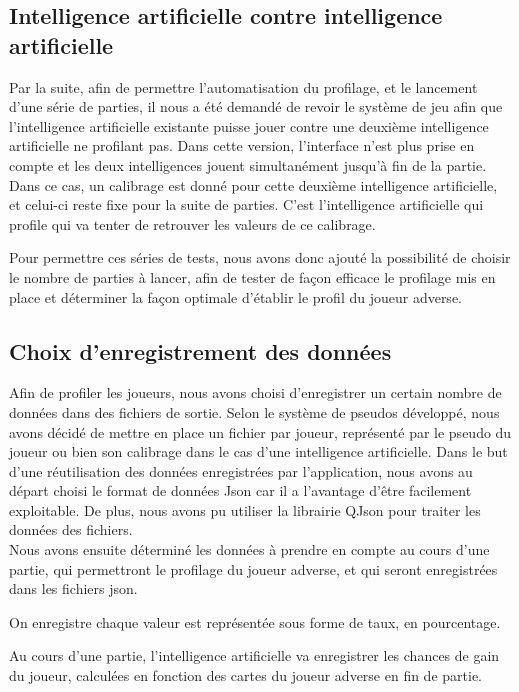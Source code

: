 \documentclass{report}
\begin{document}
\subsection{Intelligence artificielle contre intelligence artificielle}
\hspace{0.5cm}Par la suite, afin de permettre l'automatisation du profilage, et le lancement d'une série de parties, il nous a été demandé de revoir le système de jeu afin que l'intelligence artificielle existante puisse jouer contre une deuxième intelligence artificielle ne profilant pas. Dans cette version, l'interface n'est plus prise en compte et les deux intelligences jouent simultanément jusqu'à fin de la partie. Dans ce cas, un calibrage est donné pour cette deuxième intelligence artificielle, et celui-ci reste fixe pour la suite de parties. C'est l'intelligence artificielle qui profile qui va tenter de retrouver les valeurs de ce calibrage.\par
Pour permettre ces séries de tests, nous avons donc ajouté la possibilité de choisir le nombre de parties à lancer, afin de tester de façon efficace le profilage mis en place et déterminer la façon optimale d'établir le profil du joueur adverse.\par

\subsection{Choix d'enregistrement des données}

\hspace{0.5cm}Afin de profiler les joueurs, nous avons choisi d'enregistrer un certain nombre de données dans des fichiers de sortie. Selon le système de pseudos développé, nous avons décidé de mettre en place un fichier par joueur, représenté par le pseudo du joueur ou bien son calibrage dans le cas d'une intelligence artificielle. Dans le but d'une réutilisation des données enregistrées par l'application, nous avons au départ choisi le format de données Json car il a l'avantage d'être facilement exploitable. De plus, nous avons pu utiliser la librairie QJson pour traiter les données des fichiers.\\

Nous avons ensuite déterminé les données à prendre en compte au cours d'une partie, qui permettront le profilage du joueur adverse, et qui seront enregistrées dans les fichiers json.\par
On enregistre chaque valeur est représentée sous forme de taux, en pourcentage.\par
Au cours d'une partie, l'intelligence artificielle va enregistrer les chances de gain du joueur, calculées en fonction des cartes du joueur adverse en fin de partie.\par
\end{document}
